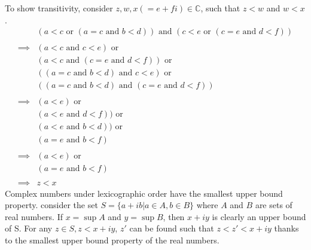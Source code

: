 \documentclass[12pt]{article}
\begin{document}
To show transitivity, consider $z, w, x(=e+fi) \in \mathbb{C}$, such that $z < w$ and $w < x$.
\begin{align*}
               & (a<c \text{ or } (a = c \text{ and } b < d))\text{ and } (c<e \text{ or } (c = e \text{ and } d < f)) \\ \\
      \implies & (a < c \text{ and } c < e) \text{ or }                                                                \\
               & (a<c \text{ and } (c = e \text{ and } d < f))\text{ or }                                              \\
               & ((a = c \text{ and } b < d) \text{ and } c<e)\text{ or }                                              \\
               & ((a = c \text{ and } b < d) \text{ and } (c = e \text{ and } d < f))                                  \\ \\
      \implies & (a < e) \text{ or }                                                                                   \\
               & (a<e \text{ and } d < f))\text{ or }                                                                  \\
               & (a<e \text{ and } b < d))\text{ or }                                                                  \\
               & (a = e \text{ and } b < f)                                                                            \\ \\
      \implies & (a < e) \text{ or }                                                                                   \\
               & (a = e \text{ and } b < f)                                                                            \\ \\
      \implies & z < x
\end{align*}
Complex numbers under lexicographic order have the smallest upper bound property.
consider the set $S = \{a+ib| a\in A, b\in B\}$ where $A$ and $B$ are sets of real numbers.
If $x = \sup{A}$ and $y = \sup{B}$, then $x+iy$ is clearly an upper bound of S. For any 
$z \in S, z<x+iy$, $z'$ can be found such that $z<z'<x+iy$ thanks to the smallest upper bound
property of the real numbers. 
\end{document}
